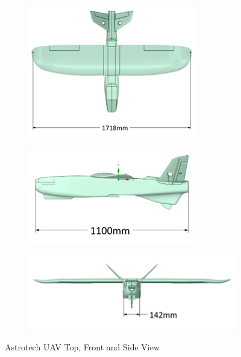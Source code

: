 \documentclass[12pt]{article}
\begin{document}
\begin{figure}
     \centering
     \begin{subfigure}[b]{0.4\textwidth}
         \centering
         \includegraphics[width=\textwidth]{unnamed (7).png}
       \end{subfigure}
     \hfill
     \begin{subfigure}[b]{0.5\textwidth}
         \centering
         \includegraphics[width=\textwidth]{unnamed (9).png}
     \end{subfigure}
     \hfill
     \begin{subfigure}[b]{0.8\textwidth}
         \centering
         \includegraphics[width=\textwidth]{unnamed (8).png}
     \end{subfigure}
     \caption{Astrotech UAV Top, Front and Side View}
    \label{fig:three graphs}
\end{figure}
\end{document}
